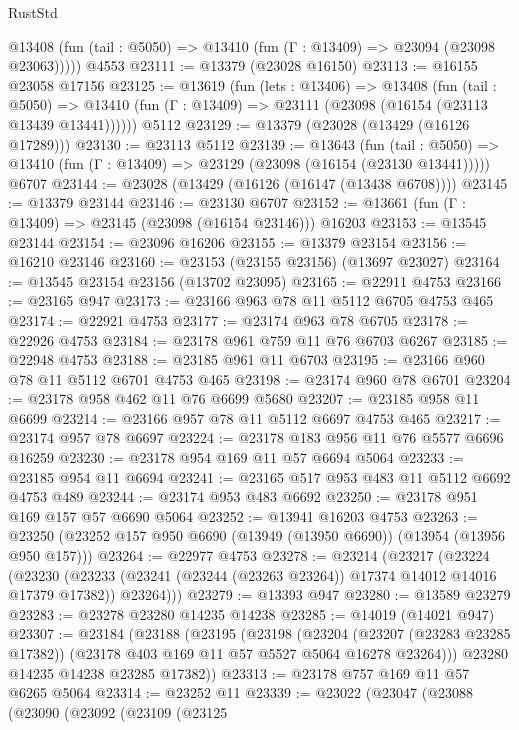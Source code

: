 \begin{lexlean}{RustStd}
\begin{coremodule}
      @13408 (fun (tail : @5050) => @13410 (fun (Γ : @13409) => @23094 (@23098 @23063)))))
    @4553
@23111 := @13379 (@23028 @16150)
@23113 := @16155 @23058 @17156
@23125 := @13619
    (fun (lets : @13406) =>
    @13408
      (fun (tail : @5050) =>
      @13410 (fun (Γ : @13409) => @23111 (@23098 (@16154 (@23113 @13439 @13441))))))
    @5112
@23129 := @13379 (@23028 (@13429 (@16126 @17289)))
@23130 := @23113 @5112
@23139 := @13643
    (fun (tail : @5050) => @13410 (fun (Γ : @13409) => @23129 (@23098 (@16154 (@23130 @13441)))))
    @6707
@23144 := @23028 (@13429 (@16126 (@16147 (@13438 @6708))))
@23145 := @13379 @23144
@23146 := @23130 @6707
@23152 := @13661 (fun (Γ : @13409) => @23145 (@23098 (@16154 @23146))) @16203
@23153 := @13545 @23144
@23154 := @23096 @16206
@23155 := @13379 @23154
@23156 := @16210 @23146
@23160 := @23153 (@23155 @23156) (@13697 @23027)
@23164 := @13545 @23154 @23156 (@13702 @23095)
@23165 := @22911 @4753
@23166 := @23165 @947
@23173 := @23166 @963 @78 @11 @5112 @6705 @4753 @465
@23174 := @22921 @4753
@23177 := @23174 @963 @78 @6705
@23178 := @22926 @4753
@23184 := @23178 @961 @759 @11 @76 @6703 @6267
@23185 := @22948 @4753
@23188 := @23185 @961 @11 @6703
@23195 := @23166 @960 @78 @11 @5112 @6701 @4753 @465
@23198 := @23174 @960 @78 @6701
@23204 := @23178 @958 @462 @11 @76 @6699 @5680
@23207 := @23185 @958 @11 @6699
@23214 := @23166 @957 @78 @11 @5112 @6697 @4753 @465
@23217 := @23174 @957 @78 @6697
@23224 := @23178 @183 @956 @11 @76 @5577 @6696 @16259
@23230 := @23178 @954 @169 @11 @57 @6694 @5064
@23233 := @23185 @954 @11 @6694
@23241 := @23165 @517 @953 @483 @11 @5112 @6692 @4753 @489
@23244 := @23174 @953 @483 @6692
@23250 := @23178 @951 @169 @157 @57 @6690 @5064
@23252 := @13941 @16203 @4753
@23263 := @23250 (@23252 @157 @950 @6690 (@13949 (@13950 @6690)) (@13954 (@13956 @950 @157)))
@23264 := @22977 @4753
@23278 := @23214
    (@23217
      (@23224
        (@23230
          (@23233 (@23241 (@23244 (@23263 @23264)) @17374 @14012 @14016 @17379 @17382))
          @23264)))
@23279 := @13393 @947
@23280 := @13589 @23279
@23283 := @23278 @23280 @14235 @14238
@23285 := @14019 (@14021 @947)
@23307 := @23184
    (@23188
      (@23195
        (@23198
          (@23204
            (@23207 (@23283 @23285 @17382))
            (@23178 @403 @169 @11 @57 @5527 @5064 @16278 @23264)))
        @23280
        @14235
        @14238
        @23285
        @17382))
@23313 := @23178 @757 @169 @11 @57 @6265 @5064
@23314 := @23252 @11
@23339 := @23022
    (@23047
      (@23088
        (@23090
          (@23092
            (@23109
              (@23125

\end{coremodule}
\end{lexlean}

